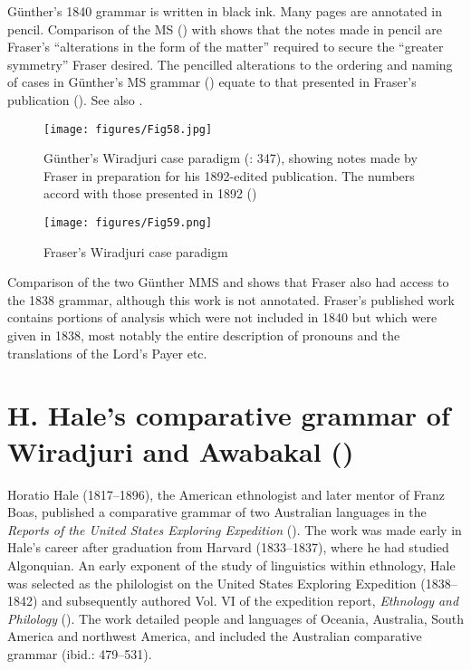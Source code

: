Günther’s 1840 grammar is written in black ink. Many pages are annotated in pencil. Comparison of the MS (\citealt{gunther_lecture_1840}) with \citet{gunther_grammar_1892} shows that the notes made in pencil are Fraser’s “alterations in the form of the matter” required to secure the “greater symmetry” Fraser desired. The pencilled alterations to the ordering and naming of cases in Günther’s MS grammar () equate to that presented in Fraser’s publication (). See also .

\begin{figure}
\texttt{[image: figures/Fig58.jpg]}
\caption{Günther's Wiradjuri case paradigm (\citeyear{gunther_lecture_1840}: 347), showing notes made by Fraser in preparation for his 1892-edited publication. The numbers accord with those presented in 1892 ()}
\label{fig:4:58}
\end{figure}

\begin{figure}
\texttt{[image: figures/Fig59.png]}
\caption{Fraser’s Wiradjuri case paradigm \citep[57]{gunther_grammar_1892}}
\label{fig:4:59}
\end{figure}


Comparison of the two Günther MMS and \citet{gunther_grammar_1892} shows that Fraser also had access to the 1838 grammar, although this work is not annotated. Fraser’s published work contains portions of analysis which were not included in 1840 but which were given in 1838, most notably the entire description of pronouns and the translations of the Lord’s Payer etc. 

\section{H. Hale’s comparative grammar of Wiradjuri and Awabakal (\citeyear{hale_languages_1846})}
\label{sec:key:4.2}

Horatio Hale (1817--1896), the American ethnologist and later mentor of Franz Boas, published a comparative grammar of two Australian languages in the \textit{Reports of the United States Exploring Expedition} (\citeyear{hale_languages_1846}). The work was made early in Hale’s career after graduation from Harvard (1833--1837), where he had studied Algonquian. An early exponent of the study of linguistics within ethnology, Hale was selected as the philologist on the United States Exploring Expedition (1838--1842) and subsequently authored Vol. VI of the expedition report, \textit{Ethnology and Philology} (\citeyear{hale_languages_1846}). The work detailed people and languages of Oceania, Australia, South America and northwest America, and included the Australian comparative grammar (ibid.: 479--531).

